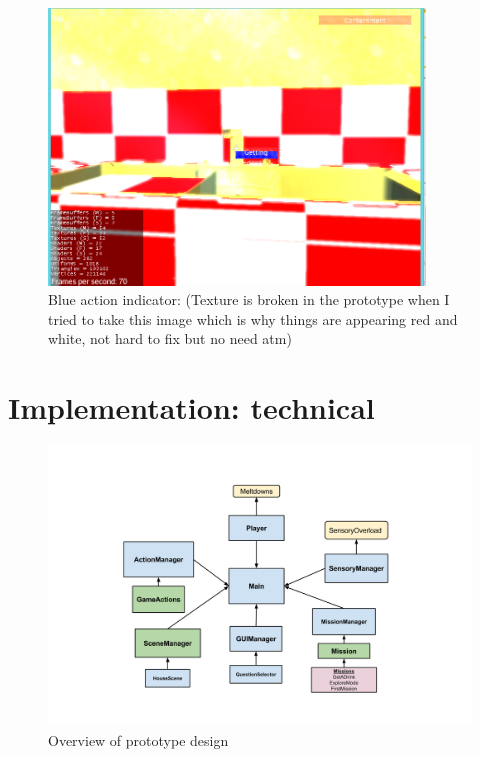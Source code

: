 \begin{figure}[H]
\centering
\includegraphics[width=100mm]{images/prototype/actionindicator.png}
\caption{Blue action indicator: (Texture is broken in the prototype when I tried to take this image which is why things are appearing red and white, not hard to fix but no need atm)}
\label{prototype_actionindicator}
\end{figure}

\section{Implementation: technical}

\begin{figure}[H]
\centering
\includegraphics[scale=0.6]{images/prototype/prototypeoverview.png}
\caption{Overview of prototype design}
\label{protooverview}
\end{figure}

